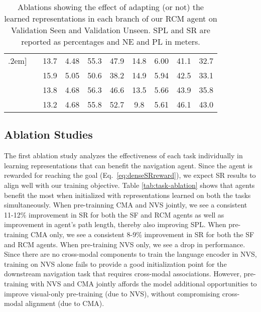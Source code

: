 \documentclass[10pt,twocolumn,letterpaper]{article}
\newcommand{\cmark}{\ding{51}}\newcommand{\xmark}{\ding{55}}\newcommand{\taskcma}{\textsc{cma}}
\begin{document}
\begin{table*}
\centering
\setlength\tabcolsep{4.5pt}
\begin{tabular}{cccccccccc} \0.2em]\Xhline{2\arrayrulewidth}
\xmark        & \xmark           & 13.7 & 4.48           & 55.3          & 47.9           & 14.8 & 6.00           & 41.1         & 32.7 \\
\cmark        & \xmark           & 15.9   & 5.05               & 50.6             & 38.2              & 14.9 & 5.94          & 42.5         & 33.1 \\
\xmark        & \cmark           & 13.8   & 4.68               & 56.3             & 46.6              & 13.5 & 5.66          & 43.9         & 35.8 \\
\cmark        & \cmark           & 13.2 & 4.68           & 55.8          & 52.7           & 9.8  & 5.61           & 46.1         & 43.0  \\

\end{tabular}
\caption{Ablations showing the effect of adapting (or not) the learned representations in each branch of our RCM agent on Validation Seen and Validation Unseen. SPL and SR are reported as percentages and NE and PL in meters.}
\label{tab:encoder-ablation}
\end{table*}


\subsection{Ablation Studies}






The first ablation study analyzes the effectiveness of each task individually in learning representations that can benefit the navigation agent. Since the agent is rewarded for reaching the goal (Eq.~\ref{eq:denseSRreward}), we expect SR results to align well with our training objective. Table \ref{tab:task-ablation} shows that agents benefit the most when initialized with representations learned on both the tasks simultaneously. When pre-trainning CMA and NVS jointly, we see a consistent 11-12\% improvement in SR for both the SF and RCM agents as well as improvement in agent's path length, thereby also improving SPL. When pre-training CMA only, we see a consistent 8-9\% improvement in SR for both the SF and RCM agents. When pre-training NVS only, we see a drop in performance. Since there are no cross-modal components to train the language encoder in NVS, training on NVS alone fails to provide a good initialization point for the downstream navigation task that requires cross-modal associations. However, pre-training with NVS and CMA jointly affords the model additional opportunities to improve visual-only pre-training (due to NVS), without compromising cross-modal alignment (due to CMA).
\end{document}
